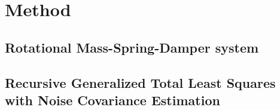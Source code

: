 \documentclass[/home/francois/latex/report/main.tex]{subfiles}
\begin{document}
\chapter{Method}

\section{Rotational Mass-Spring-Damper system}

\section{Recursive Generalized Total Least Squares with Noise Covariance Estimation}
\end{document}

